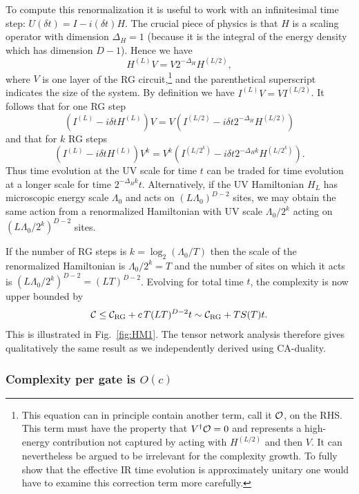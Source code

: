 \documentclass[12pt]{article}
\numberwithin{equation}{section}
\newcommand{\beq}{\begin{equation}}
\newcommand{\eeq}{\end{equation}}
\def\({\left(}
\def\){\right)}
\def\CC{{\cal C}}
\def\CO{{\cal O}}%
\begin{document}
To compute this renormalization it is useful to work with an infinitesimal time step: $U(\delta t) = I - i (\delta t)H$. The crucial piece of physics is that $H$ is a scaling operator with dimension $\Delta_H = 1$ (because it is the integral of the energy density which has dimension $D-1$). Hence we have
\beq
H^{(L)} V = V 2^{-\Delta_H} H^{(L/2)},
\eeq
where $V$ is one layer of the RG circuit,\footnote{This equation can in principle contain another term, call it $\CO$, on the RHS. This term must have the property that $V^\dagger \CO = 0$ and represents a high-energy contribution not captured by acting with $H^{(L/2)}$ and then $V$. It can nevertheless be argued to be irrelevant for the complexity growth. To fully show that the effective IR time evolution is approximately unitary one would have to examine this correction term more carefully.} and the parenthetical superscript indicates the size of the system. By definition we have $I^{(L)} V = V I^{(L/2)}$. It follows that for one RG step
\beq
\(I^{(L)} -i \delta t H^{(L)} \) V = V \(I^{(L/2)} - i \delta t 2^{-\Delta_H} H^{(L/2)} \)
\eeq
and that for $k$ RG steps
\beq
\(I^{(L)} -i \delta t H^{(L)}\) V^k = V^k \(I^{(L/2^k)} - i \delta t 2^{-\Delta_H k} H^{(L/2^k)}\).
\eeq
Thus time evolution at the UV scale for time $t$ can be traded for time evolution at a longer scale for time $ 2^{-\Delta_H k}t$. Alternatively, if the UV Hamiltonian $H_L$ has microscopic energy scale $\Lambda_0$ and acts on $(L\Lambda_0)^{D-2}$ sites, we may obtain the same action from a renormalized Hamiltonian with UV scale $\Lambda_0/2^k$ acting on $(L\Lambda_0/2^k)^{D-2}$ sites.

If the number of RG steps is $k= \log_2(\Lambda_0/T)$ then the scale of the renormalized Hamiltonian is $\Lambda_0/2^k = T$ and the number of sites on which it acts is $(L\Lambda_0/2^k)^{D-2} = (LT)^{D-2}$. Evolving for total time $t$, the complexity is now upper bounded by
\beq
\CC \leq \CC_{\text{RG}} + c \, T (LT)^{D-2} t \sim \CC_{\text{RG}} +   T S(T) t.
\eeq
This is illustrated in Fig.~\ref{fig:HM1}. The tensor network analysis therefore gives qualitatively the same result as we independently derived using CA-duality.


\subsubsection*{Complexity per gate is $O(c)$}
\end{document}
